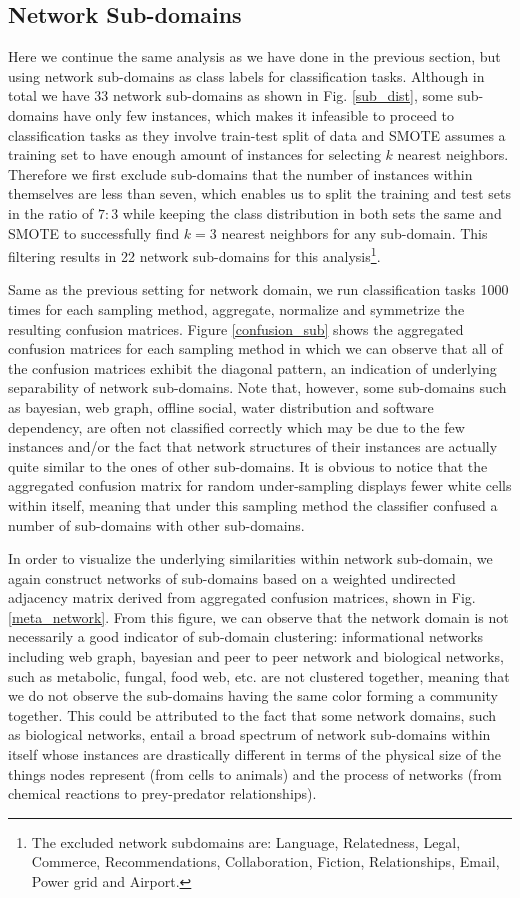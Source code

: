 \subsection*{Network Sub-domains}
Here we continue the same analysis as we have done in the previous section, but using network sub-domains as class labels for classification tasks.
Although in total we have 33 network sub-domains as shown in Fig. \ref{sub_dist}, some sub-domains have only few instances, which makes it infeasible to proceed to classification tasks as they involve train-test split of data and SMOTE assumes a training set to have enough amount of instances for selecting $k$ nearest neighbors. Therefore we first exclude sub-domains that the number of instances within themselves are less than seven, which enables us to split the training and test sets in the ratio of $7:3$ while keeping the class distribution in both sets the same and SMOTE to successfully find $k=3$ nearest neighbors for any sub-domain. This filtering results in 22 network sub-domains for this analysis\footnote{The excluded network subdomains are: Language, Relatedness, Legal, Commerce, Recommendations, Collaboration, Fiction, Relationships, Email, Power grid and Airport.}. 

Same as the previous setting for network domain, we run classification tasks 1000 times for each sampling method, aggregate, normalize and symmetrize the resulting confusion matrices. Figure \ref{confusion_sub} shows the aggregated confusion matrices for each sampling method in which we can observe that all of the confusion matrices exhibit the diagonal pattern, an indication of underlying separability of network sub-domains. Note that, however, some sub-domains such as bayesian, web graph, offline social, water distribution and software dependency, are often not classified correctly which may be due to the few instances and/or the fact that network structures of their instances are actually quite similar to the ones of other sub-domains. It is obvious to notice that the aggregated confusion matrix for random under-sampling displays fewer white cells within itself, meaning that under this sampling method the classifier confused a number of sub-domains with other sub-domains.

In order to visualize the underlying similarities within network sub-domain, we again construct networks of sub-domains based on a weighted undirected adjacency matrix derived from aggregated confusion matrices, shown in Fig.\ref{meta_network}. From this figure, we can observe that the network domain is not necessarily a good indicator of sub-domain clustering: informational networks including web graph, bayesian and peer to peer network and biological networks, such as metabolic, fungal, food web, etc. are not clustered together, meaning that we do not observe the sub-domains having the same color forming a community together. This could be attributed to the fact that some network domains, such as biological networks, entail a broad spectrum of network sub-domains within itself whose instances are drastically different in terms of the physical size of the things nodes represent (from cells to animals) and the process of networks (from chemical reactions to prey-predator relationships). 

